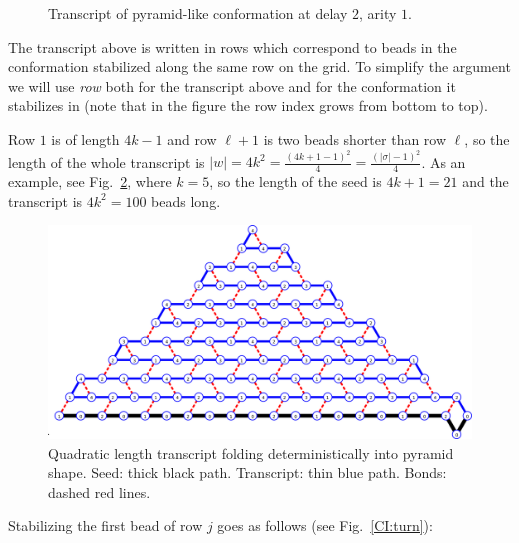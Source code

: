 \begin{figure}[h]
\begin{minipage}{.49\textwidth}
	\end{minipage}
	\caption{Transcript of pyramid-like conformation at delay $2$, arity $1$.}
	\label{table:transcript}
\end{figure}

The transcript above is written in rows which correspond to beads in the conformation stabilized along the same row on the grid. To simplify the argument we will use \textit{row} both for the transcript above and for the conformation it stabilizes in (note that in the figure the row index grows from bottom to top). 

Row $1$ is of length $4k-1$ and row $\ell+1$ is two beads shorter than row $\ell$, so the length of the whole transcript is $|w|=4k^2=\frac{(4k+1-1)^2}{4}=\frac{(|\sigma|-1)^2}{4}$. As an example, see Fig.~\ref{CI:big}, where $k=5$, so the length of the seed is $4k+1=21$ and the transcript is $4k^2 = 100$ beads long.

\begin{figure}
	\centering
	\includegraphics[width=0.7\linewidth]{./Fig/CI_Numbers}
	\caption{Quadratic length transcript folding deterministically into pyramid shape. Seed: thick black path. Transcript: thin blue path. Bonds: dashed red lines. }
	\label{CI:big}
\end{figure}


Stabilizing the first bead of row $j$ goes as follows (see Fig.~\ref{CI:turn}):

